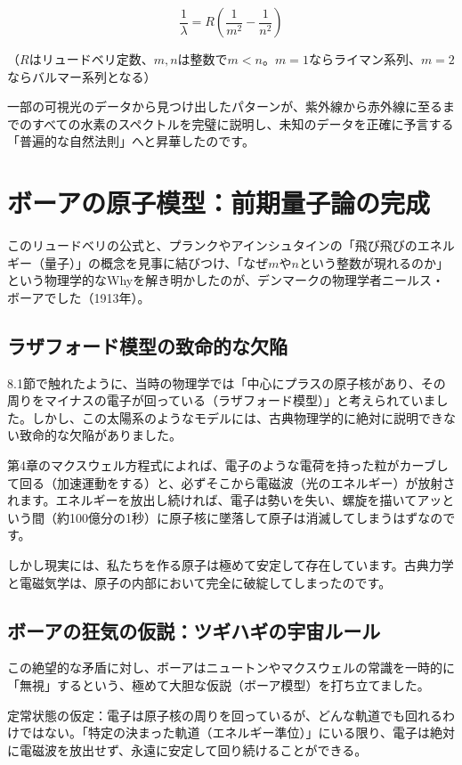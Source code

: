 \[\frac{1}{\lambda} = R \left( \frac{1}{m^2} - \frac{1}{n^2} \right)\]

（\(R\)はリュードベリ定数、\(m, n\)は整数で\(m < n\)。\(m=1\)ならライマン系列、\(m=2\)ならバルマー系列となる）

一部の可視光のデータから見つけ出したパターンが、紫外線から赤外線に至るまでのすべての水素のスペクトルを完璧に説明し、未知のデータを正確に予言する「普遍的な自然法則」へと昇華したのです。

\section{ボーアの原子模型：前期量子論の完成}

このリュードベリの公式と、プランクやアインシュタインの「飛び飛びのエネルギー（量子）」の概念を見事に結びつけ、「なぜ\(m\)や\(n\)という整数が現れるのか」という物理学的なWhyを解き明かしたのが、デンマークの物理学者ニールス・ボーアでした（1913年）。

\subsection{ラザフォード模型の致命的な欠陥}

8.1節で触れたように、当時の物理学では「中心にプラスの原子核があり、その周りをマイナスの電子が回っている（ラザフォード模型）」と考えられていました。しかし、この太陽系のようなモデルには、古典物理学的に絶対に説明できない致命的な欠陥がありました。

第4章のマクスウェル方程式によれば、電子のような電荷を持った粒がカーブして回る（加速運動をする）と、必ずそこから電磁波（光のエネルギー）が放射されます。エネルギーを放出し続ければ、電子は勢いを失い、螺旋を描いてアッという間（約100億分の1秒）に原子核に墜落して原子は消滅してしまうはずなのです。

しかし現実には、私たちを作る原子は極めて安定して存在しています。古典力学と電磁気学は、原子の内部において完全に破綻してしまったのです。

\subsection{ボーアの狂気の仮説：ツギハギの宇宙ルール}

この絶望的な矛盾に対し、ボーアはニュートンやマクスウェルの常識を一時的に「無視」するという、極めて大胆な仮説（ボーア模型）を打ち立てました。

定常状態の仮定：電子は原子核の周りを回っているが、どんな軌道でも回れるわけではない。「特定の決まった軌道（エネルギー準位）」にいる限り、電子は絶対に電磁波を放出せず、永遠に安定して回り続けることができる。

